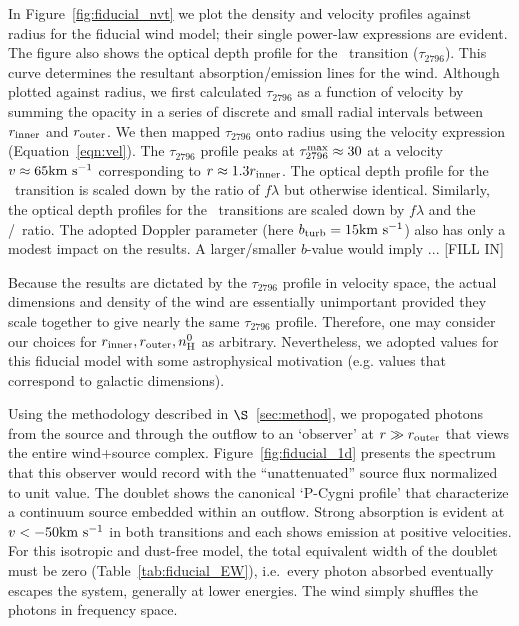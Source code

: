 \documentclass[12pt,preprint]{aastex}
\begin{document}
In Figure~\ref{fig:fiducial_nvt} we plot the density and velocity
profiles against radius for the fiducial wind model;  
their single power-law expressions are evident.  The figure also
shows the optical depth profile for the \mgiia\ transition ($\tau_{2796}$).
This curve determines the resultant absorption/emission lines
for the wind.  
Although plotted against radius, we first calculated $\tau_{2796}$ 
as a function of velocity by summing the opacity in a series of
discrete and small radial intervals
between $r_{\rm inner}$  and $r_{\rm outer}$.   We then mapped
$\tau_{2796}$ onto radius using the velocity expression
(Equation~\ref{eqn:vel}). 
The $\tau_{2796}$ profile peaks at $\tau_{2796}^{\rm max} \approx 30$
at a velocity $v \approx 65 {\rm km~s^{-1}}$ corresponding to $r \approx 1.3
r_{\rm inner}$.  The optical depth profile for the \mgiib\ transition
is scaled down by the ratio of $f\lambda$ but otherwise identical.  Similarly,
the optical depth profiles for the \feiid\ transitions are
scaled down by $f \lambda$ and the \nfe/\nmg\ ratio.  
The adopted Doppler parameter
(here $b_{\rm turb} = 15 {\rm km~s^{-1}}$) also has only a modest impact on the results.
A larger/smaller $b$-value would imply ... [FILL IN]

Because the results are dictated by the $\tau_{2796}$ profile in
velocity space, the actual dimensions and density of the wind are
essentially unimportant provided they scale together to give nearly the same
$\tau_{2796}$ profile.  Therefore, one may consider our choices for
$r_{\rm inner}, r_{\rm outer}, n_{\rm H}^0$ as arbitrary.
Nevertheless, we adopted values for this fiducial model with
some astrophysical motivation (e.g. values that correspond to
galactic dimensions).


Using the methodology described in $\S$~\ref{sec:method}, we
propogated photons from the source and through the outflow to an
`observer' at $r \gg r_{\rm outer}$ that views the entire wind+source
complex.  Figure~\ref{fig:fiducial_1d} presents the spectrum
that this observer would record with the ``unattenuated'' source flux
normalized to unit value.   The  doublet
shows the canonical `P-Cygni profile' that characterize a continuum
source embedded within an outflow.  Strong absorption is evident at
$v < -50 {\rm km~s^{-1}}$ in both transitions and each shows emission at
positive velocities.  For this isotropic and dust-free model, the
total equivalent width of the doublet must be zero
(Table~\ref{tab:fiducial_EW}), i.e.\ every photon
absorbed eventually escapes the system, generally at lower
energies.  The wind simply shuffles the photons in frequency space.
\end{document}
